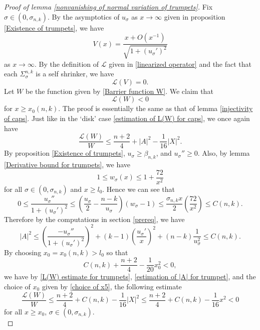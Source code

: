\documentclass[pdflatex,sn-mathphys-num]{sn-jnl}
\begin{document}
\begin{proof}[Proof of lemma \ref{nonvanishing of normal variation of trumpets}]
     Fix $\sigma \in (0, \sigma_{n,k})$. 
    By the asymptotics of $u_{\sigma}$ as $x \to \infty$ given in proposition \ref{Existence of trumpets}, we have
    \begin{equation}\label{asymptotic expansion of V as x to infty}
        V(x) = \frac{x + O(x^{-1})}{\sqrt{1 + (u_{\sigma}')^2}}
    \end{equation}
    as $x \to \infty$. By the definition of $\mathcal{L}$ given in \eqref{linearized operator} and the fact that each $\Sigma^{n,k}_{\sigma}$ is a self shrinker, we have
    \begin{equation}
        \mathcal{L}(V) = 0.
    \end{equation}
    Let $W$ be the function given by \eqref{Barrier function W}. We claim that 
    \begin{equation}\label{W is supersolution on trumpets}
        \mathcal{L}(W) < 0
    \end{equation}
    for $x \geq x_0(n,k)$. The proof is essentially the same as that of lemma \ref{injectivity of caps}. Just like in the `disk' case \eqref{estimation of L(W) for caps}, we once again have
    \begin{equation}\label{L(W) estimate for trumpets}
        \frac{\mathcal{L}(W)}{W} \leq \frac{n+2}{4} + |A|^2 - \frac{1}{16}|X|^2.
    \end{equation}
    By proposition \ref{Existence of trumpets}, $u_{\sigma} \geq \beta_{n,k}$, and $u_{\sigma}'' \geq 0$. Also, by lemma \ref{Derivative bound for trumpets}, we have
    $$1 \leq w_{\sigma}(x) \leq  1 + \frac{72}{x^2} $$
    for all $\sigma \in (0, \sigma_{n,k})$ and $x \geq l_0$. Hence we can see that \begin{equation}
        0 \leq \frac{u_{\sigma}''}{1 + (u_{\sigma}')^2} \leq (\frac{u_{\sigma}}{2} - \frac{n-k}{u_{\sigma}})(w_{\sigma}-1) \leq \frac{\sigma_{n,k}x}{2}( \frac{72}{x^2}) \leq C(n,k).
    \end{equation} 
     Therefore by the computations in section \ref{prereq}, we have
     \begin{equation}\label{estimation of |A| for trumpet}
       |A|^2 \leq (\frac{-u_{\sigma}''}{1 + (u_{\sigma}')^2})^2 + (k-1)(\frac{u_{\sigma}'}{x})^2 + (n-k)\frac{1}{u_{\sigma}^2} \leq C(n,k). 
    \end{equation}
   By choosing $x_0 = x_0(n,k) > l_0$ so that
    \begin{equation}\label{choice of x5}
        C(n,k) + \frac{n + 2}{4} - \frac{1}{20}x_0^2 < 0,
    \end{equation}
    we have by \eqref{L(W) estimate for trumpets}, \eqref{estimation of |A| for trumpet}, and the choice of $x_0$ given by \eqref{choice of x5}, the following estimate
    \begin{equation}
        \frac{\mathcal{L}(W)}{W}\leq \frac{n+2}{4} + C(n,k) - \frac{1}{16}|X|^2 \leq \frac{n+2}{4} + C(n,k) - \frac{1}{16}x^2 < 0
    \end{equation}
    for all $x \geq x_0$, $\sigma \in (0, \sigma_{n,k})$.\\
    

\end{proof}
\end{document}
